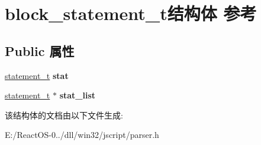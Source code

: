 \hypertarget{structblock__statement__t}{}\section{block\+\_\+statement\+\_\+t结构体 参考}
\label{structblock__statement__t}
\subsection*{Public 属性}
\begin{DoxyCompactItemize}
\item 
\mbox{\label{structblock__statement__t_a0d152e1f01adc26670b0f14bd0eb32d0}} 
\hyperlink{struct__statement__t}{statement\+\_\+t} {\bfseries stat}
\item 
\mbox{\label{structblock__statement__t_acaea605b0f88382ee7c7b8ed18fb7272}} 
\hyperlink{struct__statement__t}{statement\+\_\+t} $\ast$ {\bfseries stat\+\_\+list}
\end{DoxyCompactItemize}


该结构体的文档由以下文件生成\+:\begin{DoxyCompactItemize}
\item 
E\+:/\+React\+O\+S-\/0../dll/win32/jscript/parser.\+h\end{DoxyCompactItemize}
